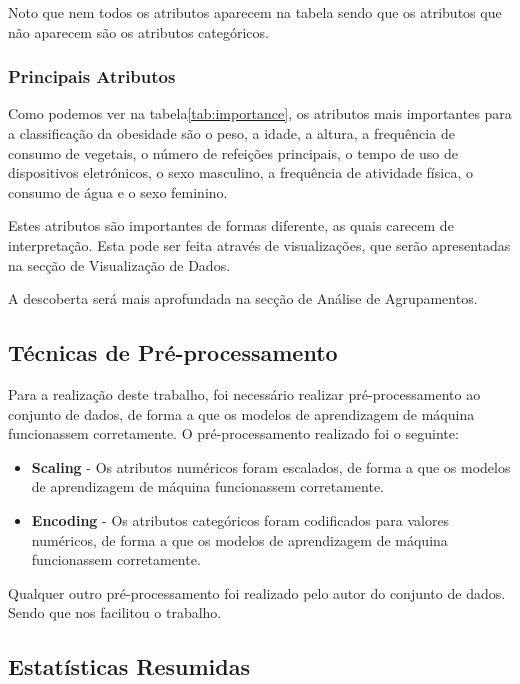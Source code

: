 \documentclass{easychair}
\begin{document}
Noto que nem todos os atributos aparecem na tabela sendo que os atributos que não aparecem são os atributos categóricos.

\subsubsection{Principais Atributos}

Como podemos ver na tabela\ref{tab:importance}, os atributos mais importantes para a classificação da obesidade são o peso, a idade, a altura, a frequência de consumo de vegetais, o número de refeições principais, o tempo de uso de dispositivos eletrónicos, o sexo masculino, a frequência de atividade física, o consumo de água e o sexo feminino.

Estes atributos são importantes de formas diferente, as quais carecem de interpretação. Esta pode ser feita através de visualizações, que serão apresentadas na secção de Visualização de Dados.

A descoberta será mais aprofundada na secção de Análise de Agrupamentos.

\subsection{Técnicas de Pré-processamento}

Para a realização deste trabalho, foi necessário realizar pré-processamento ao conjunto de dados, de forma a que os modelos de aprendizagem de máquina funcionassem corretamente. O pré-processamento realizado foi o seguinte:

\begin{itemize}
  \item \textbf{Scaling} - Os atributos numéricos foram escalados, de forma a que os modelos de aprendizagem de máquina funcionassem corretamente.
  \item \textbf{Encoding} - Os atributos categóricos foram codificados para valores numéricos, de forma a que os modelos de aprendizagem de máquina funcionassem corretamente.
\end{itemize}

Qualquer outro pré-processamento foi realizado pelo autor do conjunto de dados. Sendo que nos facilitou o trabalho.

\subsection{Estatísticas Resumidas}
\end{document}
